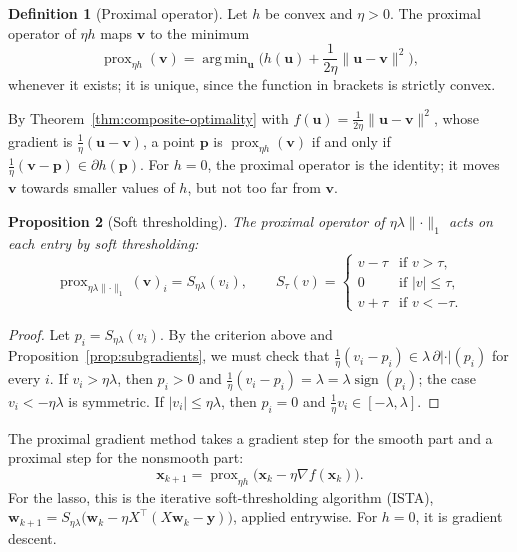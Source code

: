 \documentclass[11pt]{article}
\newcommand{\norm}[1]{\lVert #1 \rVert}
\theoremstyle{definition}
\newtheorem{definition}{Definition}[section]
\theoremstyle{plain}
\newtheorem{proposition}[definition]{Proposition}
\theoremstyle{remark}
\DeclareMathOperator{\sign}{sign}
\DeclareMathOperator*{\argmin}{arg\,min}
\begin{document}
\begin{definition}[Proximal operator]\label{def:prox}
    Let $h$ be convex and $\eta > 0$. The proximal operator of $\eta h$ maps $\mathbf{v}$ to the minimum
    \[\operatorname{prox}_{\eta h}(\mathbf{v}) = \argmin_{\mathbf{u}} \Big(h(\mathbf{u}) + \frac{1}{2\eta}\norm{\mathbf{u} - \mathbf{v}}^2\Big),\]
    whenever it exists; it is unique, since the function in brackets is strictly convex.
\end{definition}

By Theorem~\ref{thm:composite-optimality} with $f(\mathbf{u}) = \frac{1}{2\eta}\norm{\mathbf{u} - \mathbf{v}}^2$, whose gradient is $\frac{1}{\eta}(\mathbf{u} - \mathbf{v})$, a point $\mathbf{p}$ is $\operatorname{prox}_{\eta h}(\mathbf{v})$ if and only if $\frac{1}{\eta}(\mathbf{v} - \mathbf{p}) \in \partial h(\mathbf{p})$. For $h = 0$, the proximal operator is the identity; it moves $\mathbf{v}$ towards smaller values of $h$, but not too far from $\mathbf{v}$.

\begin{proposition}[Soft thresholding]\label{prop:soft-threshold}
    The proximal operator of $\eta\lambda\norm{\cdot}_1$ acts on each entry by soft thresholding:
    \[\operatorname{prox}_{\eta\lambda\norm{\cdot}_1}(\mathbf{v})_i = S_{\eta\lambda}(v_i), \qquad S_\tau(v) = \begin{cases} v - \tau & \text{if } v > \tau, \\ 0 & \text{if } |v| \leq \tau, \\ v + \tau & \text{if } v < -\tau. \end{cases}\]
\end{proposition}

\begin{proof}
    Let $p_i = S_{\eta\lambda}(v_i)$. By the criterion above and Proposition~\ref{prop:subgradients}, we must check that $\frac{1}{\eta}(v_i - p_i) \in \lambda\,\partial|\cdot|(p_i)$ for every $i$. If $v_i > \eta\lambda$, then $p_i > 0$ and $\frac{1}{\eta}(v_i - p_i) = \lambda = \lambda\sign(p_i)$; the case $v_i < -\eta\lambda$ is symmetric. If $|v_i| \leq \eta\lambda$, then $p_i = 0$ and $\frac{1}{\eta}v_i \in [-\lambda, \lambda]$.
\end{proof}

The proximal gradient method takes a gradient step for the smooth part and a proximal step for the nonsmooth part:
\[\mathbf{x}_{k+1} = \operatorname{prox}_{\eta h}\big(\mathbf{x}_k - \eta\nabla f(\mathbf{x}_k)\big).\]
For the lasso, this is the iterative soft-thresholding algorithm (ISTA), $\mathbf{w}_{k+1} = S_{\eta\lambda}\big(\mathbf{w}_k - \eta X^\top(X\mathbf{w}_k - \mathbf{y})\big)$, applied entrywise. For $h = 0$, it is gradient descent.
\end{document}
